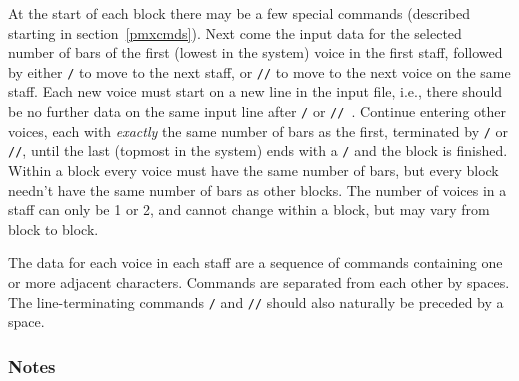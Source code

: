 \documentclass[11pt]{article}
\begin{document}
At the start of each block there may be a few special commands 
(described starting in section~\ref{pmxcmds}).  
Next come the input data for the selected number 
of bars of the first (lowest in the system) voice in the first staff, followed by 
either {\tt /} to move to the next staff, or {\tt //} to move to the next voice 
on the same staff.  Each new voice must start on a new line 
in the input file, i.e., there should be no further data on the same input line
after {\tt /} or {\tt // }. 
   Continue entering other voices, each with 
{\it exactly} the same number of bars as the first, 
terminated by {\tt /} or {\tt //}, until
 the last (topmost in the system) ends with a {\tt /} and the block is 
finished.  Within 
a block every voice must have the same number of bars, but every block 
needn't have the same number of bars as other blocks.  The number of 
voices in a staff can only be 1 or 2, and cannot change within a block, but
may vary from block to block. 

	The data for each voice in each staff are a sequence of commands 
containing one or more adjacent characters.  Commands are separated from each
other by spaces.  The line-terminating commands {\tt /} and {\tt //} should also
naturally be preceded by a space.

\subsubsection{Notes} \label{notes}
\end{document}
